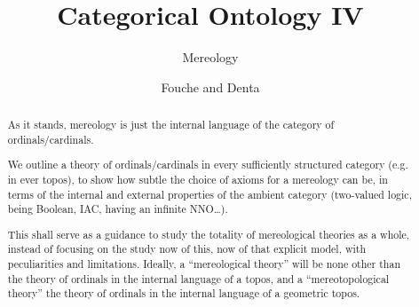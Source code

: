 \documentclass{amsart}
\author{Fouche and Denta}
\title{Categorical Ontology IV}
\subtitle{Mereology}
\begin{document}
\maketitle
\begin{abstract}
  As it stands, mereology is just the internal language of the category of ordinals/cardinals.

  We outline a theory of ordinals/cardinals in every sufficiently structured category (e.g. in ever topos), to show how subtle the choice of axioms for a mereology can be, in terms of the internal and external properties of the ambient category (two-valued logic, being Boolean, IAC, having an infinite NNO\dots).

  This shall serve as a guidance to study the totality of mereological theories as a whole, instead of focusing on the study now of this, now of that explicit model, with peculiarities and limitations. Ideally, a ``mereological theory'' will be none other than the theory of ordinals in the internal language of a topos, and a ``mereotopological theory'' the theory of ordinals in the internal language of a geometric topos.
\end{abstract}
\section{}
\section{}
\section{}
\section{}
\end{document}
